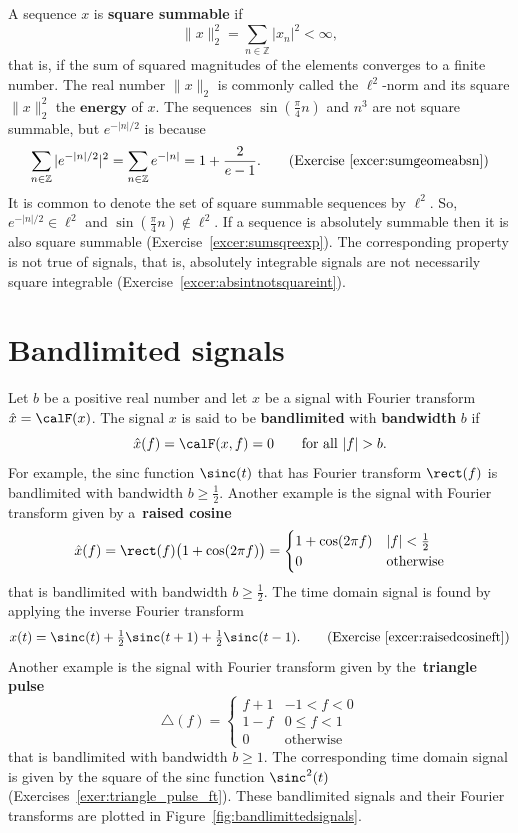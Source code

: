 \documentclass[11pt,a4paper]{book}
\theoremstyle{plain}
\numberwithin{equation}{section}
\newcommand{\ints}{{\mathbb Z}}
\newcommand{\term}{\textbf}
\newcommand{\abs}[1]{\left\vert #1 \right\vert}
\newcommand{\sabs}[1]{\vert #1 \vert}
\begin{document}
A sequence $x$ is \term{square summable} if
\[
\|x\|_2^2 = \sum_{n \in \ints} \sabs{x_n}^2 < \infty,
\]
that is, if the sum of squared magnitudes of the elements converges to a finite number.  The real number $\|x\|_2$ is commonly called the $\ell^2$-norm and its square $\|x\|^2_2$ the $\term{energy}$ of $x$.  The sequences $\sin(\tfrac{\pi}{4} n)$ and $n^3$ are not square summable, but $e^{-\abs{n}/2}$ is because 
\[
\sum_{n \in \ints} \sabs{e^{-\sabs{n}/2}}^2 = \sum_{n \in \ints} e^{-\abs{n}} = 1 + \frac{2}{e - 1}. \qquad \text{(Exercise~\ref{excer:sumgeomeabsn})}
\]
It is common to denote the set of square summable sequences by $\ell^2$.  So, $e^{-\sabs{n}/2} \in \ell^2$ and $\sin(\tfrac{\pi}{4} n) \notin \ell^2$.  If a sequence is absolutely summable then it is also square summable (Exercise~\ref{excer:sumsqreexp}).  The corresponding property is not true of signals, that is, absolutely integrable signals are not necessarily square integrable (Exercise~\ref{excer:absintnotsquareint}).


\section{Bandlimited signals}\label{sec:bandlimited-signals}

Let $b$ be a positive real number and let $x$ be a signal with Fourier transform $\hat{x} = \calF(x)$.  The signal $x$ is said to be \term{bandlimited} with \term{bandwidth} $b$ if 
\[
\hat{x}(f) = \calF(x,f) = 0 \qquad \text{for all $\abs{f} > b$}.
\]  
For example, the sinc function $\sinc(t)$ that has Fourier transform $\rect(f)$ is bandlimited with bandwidth $b \geq \tfrac{1}{2}$.  Another example is the signal with Fourier transform given by a~\term{raised cosine}
\[
\hat{x}(f) = \rect(f) \big(1 + \cos( 2 \pi f )\big) = \begin{cases}
1 + \cos( 2\pi f ) & \abs{f} < \tfrac{1}{2} \\
0 & \text{otherwise}
\end{cases}
\]
that is bandlimited with bandwidth $b \geq \tfrac{1}{2}$.  The time domain signal is found by applying the inverse Fourier transform 
\[
x(t) = \sinc(t)+\tfrac{1}{2}\sinc(t+1)+\tfrac{1}{2}\sinc(t-1). \qquad \text{(Exercise~\ref{excer:raisedcosineft})}%
\]
Another example is the signal with Fourier transform given by the~\term{triangle pulse}
\[
\bigtriangleup(f) = \begin{cases}
f + 1 & -1 < f < 0 \\
1 - f & 0 \leq f < 1 \\
0 & \text{otherwise}
\end{cases}
\]
that is bandlimited with bandwidth $b \geq 1$.  The corresponding time domain signal is given by the square of the sinc function $\sinc^2(t)$ (Exercises~\ref{exer:triangle_pulse_ft}).  These bandlimited signals and their Fourier transforms are plotted in Figure~\ref{fig:bandlimittedsignals}.
\end{document}
